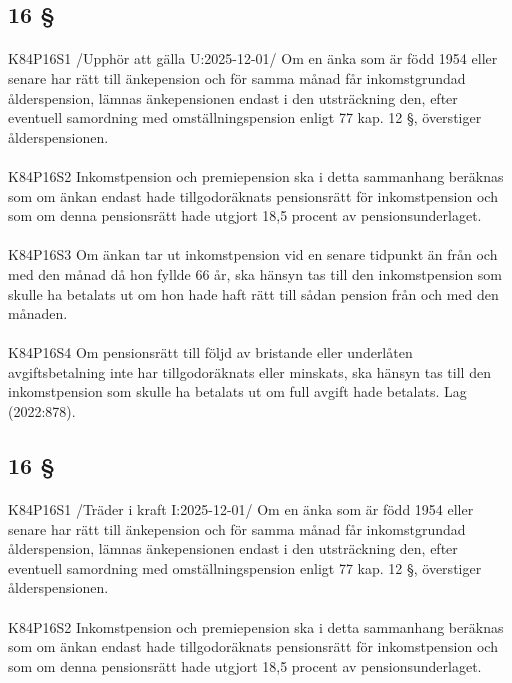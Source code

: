 \documentclass[a4paper,notitlepage,openany,10pt]{book}
\begin{document}
\subsection*{16 §}
\paragraph*{}
{\tiny K84P16S1}
/Upphör att gälla U:2025-12-01/
Om en änka som är född 1954 eller senare har rätt till änkepension och för samma månad får inkomstgrundad ålderspension, lämnas änkepensionen endast i den utsträckning den, efter eventuell samordning med omställningspension enligt 77 kap. 12 §, överstiger ålderspensionen.
\paragraph*{}
{\tiny K84P16S2}
Inkomstpension och premiepension ska i detta sammanhang beräknas som om änkan endast hade tillgodoräknats pensionsrätt för inkomstpension och som om denna pensionsrätt hade utgjort 18,5 procent av pensionsunderlaget.
\paragraph*{}
{\tiny K84P16S3}
Om änkan tar ut inkomstpension vid en senare tidpunkt än från och med den månad då hon fyllde 66 år, ska hänsyn tas till den inkomstpension som skulle ha betalats ut om hon hade haft rätt till sådan pension från och med den månaden.
\paragraph*{}
{\tiny K84P16S4}
Om pensionsrätt till följd av bristande eller underlåten avgiftsbetalning inte har tillgodoräknats eller minskats, ska hänsyn tas till den inkomstpension som skulle ha betalats ut om full avgift hade betalats.
Lag (2022:878).
\subsection*{16 §}
\paragraph*{}
{\tiny K84P16S1}
/Träder i kraft I:2025-12-01/
Om en änka som är född 1954 eller senare har rätt till änkepension och för samma månad får inkomstgrundad ålderspension, lämnas änkepensionen endast i den utsträckning den, efter eventuell samordning med omställningspension enligt 77 kap. 12 §, överstiger ålderspensionen.
\paragraph*{}
{\tiny K84P16S2}
Inkomstpension och premiepension ska i detta sammanhang beräknas som om änkan endast hade tillgodoräknats pensionsrätt för inkomstpension och som om denna pensionsrätt hade utgjort 18,5 procent av pensionsunderlaget.
\end{document}

